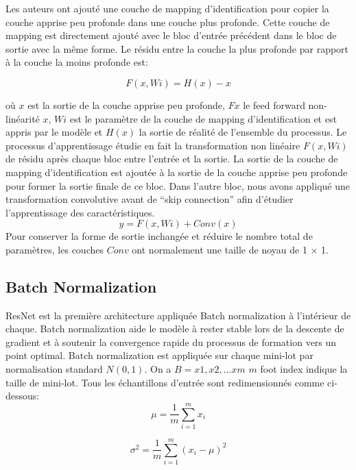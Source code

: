 \documentclass{article}
\begin{document}
Les auteurs ont ajouté une couche de mapping d'identification pour copier la couche apprise peu profonde dans une couche
plus profonde. Cette couche de mapping est directement ajouté avec le bloc d'entrée précédent dans le bloc de sortie avec
la même forme.
Le résidu entre la couche la plus profonde par rapport à la couche la moins profonde est:

\begin{equation}
    F(x,Wi) = H(x) - x
\end{equation}

où $x$ est la sortie de la couche apprise peu profonde, $Fx$ le feed forward non-linéarité $x$, $Wi$ est le paramètre de
la couche de mapping d'identification et est appris par le modèle et $H(x)$ la sortie de réalité de l'ensemble du processus.
Le processus d'apprentissage étudie en fait la transformation non linéaire $F(x,Wi)$ de résidu après chaque bloc entre
l'entrée et la sortie.
La sortie de la couche de mapping d'identification est ajoutée à la sortie de la couche apprise peu profonde pour former
la sortie finale de ce bloc.
Dans l'autre bloc, nous avons appliqué une transformation convolutive avant de ``skip connection'' afin d'étudier l'apprentissage
des caractéristiques.
\begin{equation}
    y = F(x,Wi) +Conv(x)
\end{equation}
Pour conserver la forme de sortie inchangée et réduire le nombre total de paramètres, les couches $Conv$ ont normalement
une taille de noyau de 1 $\times$ 1.
\subsection{Batch Normalization}
ResNet est la première architecture appliquée Batch normalization à l'intérieur de chaque. Batch normalization aide le
modèle à rester stable lors de la descente de gradient et à soutenir la convergence rapide du processus de formation vers
un point optimal.
Batch normalization est appliquée sur chaque mini-lot par normalisation standard $N(0,1)$. On a $B=x1,x2,...xm$ $m$ foot
index indique la taille de mini-lot. Tous les échantillons d'entrée sont redimensionnés comme ci-dessous:
\begin{equation}
    \mu = \frac{1}{m}\sum_{i=1}^{m}x_{i}
\end{equation}

\begin{equation}
    \sigma^{2} = \frac{1}{m}\sum_{i=1}^{m}(x_{i} - \mu)^{2}
\end{equation}
\end{document}
